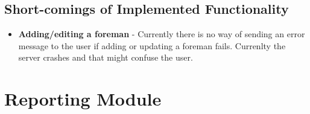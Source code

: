 \documentclass[11pt,fleqn]{book} %
\begin{document}
		\subsection{Short-comings of Implemented Functionality}
			\begin{itemize}
				\item\textbf{Adding/editing a foreman} -
				Currently there is no way of sending an error message to the user if adding or updating a foreman fails. Currenlty the server crashes and that might confuse the user.							
			\end{itemize}
%				
%				
			
	\section{Reporting Module}
\end{document}
